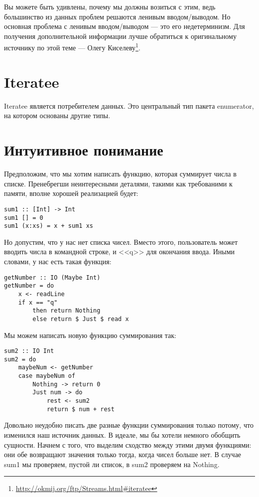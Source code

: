 \begin{remark}
Вы можете быть удивлены, почему мы должны возиться с этим, ведь большинство из данных проблем решаются ленивым вводом/выводом. Но основная проблема с ленивым вводом/выводом --- это его недетерминизм. Для получения дополнительной информации лучше обратиться к оригинальному источнику по этой теме --- Олегу Киселеву\footnote{\href{http://okmij.org/ftp/Streams.html#iteratee}{http://okmij.org/ftp/Streams.html#iteratee}}.
\end{remark}

\section{Iteratee}

Iteratee является потребителем данных. Это центральный тип пакета enumerator, на котором основаны другие типы.

\section{Интуитивное понимание}

Предположим, что мы хотим написать функцию, которая суммирует числа в списке. Пренебрегши неинтересными деталями, такими как требованими к памяти, вполне хорошей реализацией будет:

\begin{lstlisting}
sum1 :: [Int] -> Int
sum1 [] = 0
sum1 (x:xs) = x + sum1 xs
\end{lstlisting}

Но допустим, что у нас нет списка чисел. Вместо этого, пользователь может вводить числа в командной строке, и <<q>> для окончания ввода. Иными словами, у нас есть такая функция:

\begin{lstlisting}
getNumber :: IO (Maybe Int)
getNumber = do
    x <- readLine
    if x == "q"
        then return Nothing
        else return $ Just $ read x
\end{lstlisting}%

Мы можем написать новую функцию суммирования так:

\begin{lstlisting}
sum2 :: IO Int
sum2 = do
    maybeNum <- getNumber
    case maybeNum of
        Nothing -> return 0
        Just num -> do
            rest <- sum2
            return $ num + rest
\end{lstlisting}%

Довольно неудобно писать две разные функции суммирования только потому, что изменился наш источник данных. В идеале, мы бы хотели немного обобщить сущности. Начнем с того, что выделим сходство между этими двумя функциями: они обе возвращают значения только тогда, когда чисел больше нет. В случае sum1 мы проверяем, пустой ли список, в sum2 проверяем на Nothing.

